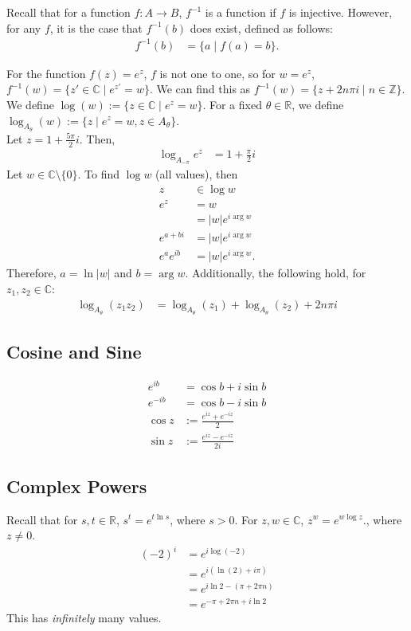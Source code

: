 \documentclass[10pt]{extarticle}
\newcommand{\Z}{\mathbb{Z}}
\newcommand{\R}{\mathbb{R}}
\newcommand{\C}{\mathbb{C}}
\begin{document}
  Recall that for a function $f: A\rightarrow B$, $f^{-1}$ is a function if $f$ is injective. However, for any $f$, it is the case that $f^{-1}(b)$ does exist, defined as follows:
  \begin{align*}
    f^{-1}(b) &= \{a\mid f(a) = b\}.
  \end{align*}

  For the function $f(z) = e^z$, $f$ is not one to one, so for $w = e^z$, $f^{-1}(w) = \{z'\in\C \mid e^{z'} = w\}$. We can find this as $f^{-1}(w) = \{z + 2n\pi i\mid n\in\Z\}$.\\

  We define $\log(w) := \{z\in\C\mid e^z = w\}$. For a fixed $\theta\in\R$, we define $\log_{A_{\theta}}(w) := \{z\mid e^{z}=w,z\in A_{\theta}\}$.\\

  Let $z = 1 + \frac{5\pi}{2}i$. Then,
  \begin{align*}
    \log_{A_{-\pi}}e^z &= 1 + \frac{\pi}{2}i
  \end{align*}
  Let $w\in \C\setminus\{0\}$. To find $\log w$ (all values), then
  \begin{align*}
    z&\in \log w\\
    e^z &= w\\
        &= |w|e^{i\arg w}\\
    e^{a+bi} &= |w|e^{i\arg w}\\
    e^ae^{ib} &= |w|e^{i\arg w}.
  \end{align*}
  Therefore, $a = \ln|w|$ and $b = \arg w$. Additionally, the following hold, for $z_1,z_2\in \C$:
  \begin{align*}
    \log_{A_{\theta}}(z_1z_2) &= \log_{A_{\theta}}(z_1) + \log_{A_{\theta}}(z_2) + 2n\pi i
  \end{align*}
  \subsection{Cosine and Sine}%
  \begin{align*}
    e^{ib} &= \cos b + i\sin b\\
    e^{-ib} &= \cos b - i\sin b\\
    \cos z &:= \frac{e^{iz} + e^{-iz}}{2}\\
    \sin z &:= \frac{e^{iz}-e^{-iz}}{2i}
  \end{align*}
  \subsection{Complex Powers}%
  Recall that for $s,t\in\R$, $s^t = e^{t\ln s}$, where $s > 0$. For $z,w\in \C$, $z^w = e^{w\log z}$., where $z\neq 0$.
  \begin{align*}
    (-2)^{i} &= e^{i\log(-2)}\\
             &= e^{i\left(\ln(2) + i\pi\right)}\\
             &= e^{i\ln 2 - (\pi + 2\pi n)}\\
             &= e^{-\pi + 2\pi n + i\ln 2}
  \end{align*}
  This has \textit{infinitely} many values.\\
\end{document}
